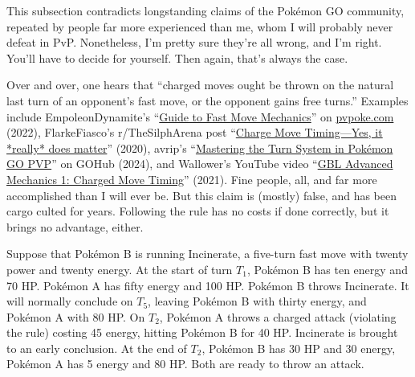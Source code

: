 \begin{tipbox}[title=Warning! Achtung! \begin{chinese}危险！\end{chinese} ¡Peligro! \begin{japanese}危険!\end{japanese} \textit{Tulaga faigata!}]
This subsection contradicts longstanding claims of the Pokémon GO community, repeated by
  people far more experienced than me, whom I will probably never defeat in PvP.
Nonetheless, I'm pretty sure they're all wrong, and I'm right.
You'll have to decide for yourself.
Then again, that's always the case.
\end{tipbox}
\noindent{}Over and over, one hears that ``charged moves ought be thrown on the natural last turn of an
 opponent's fast move, or the opponent gains free turns.''
Examples include EmpoleonDynamite's ``\href{https://pvpoke.com/articles/strategy/guide-to-fast-move-registration/}{Guide to Fast Move Mechanics}''
 on \href{https://pvpoke.com}{pvpoke.com} (2022), FlarkeFiasco's r/TheSilphArena post ``\href{reddit.com/r/TheSilphArena/comments/fvu62a/charge\_move\_timing\_yes\_it\_really\_does\_matter/}{Charge Move Timing---Yes, it *really* does matter}'' (2020),
 avrip's ``\href{https://pokemongohub.net/post/pvp/mastering-the-turn-system-in-pokemon-go-pvp/}{Mastering the Turn System in Pokémon GO PVP}'' on GOHub (2024),
 and Wallower's YouTube video ``\href{https://www.youtube.com/watch?v=pAtCo8xg700}{GBL Advanced Mechanics 1: Charged Move Timing}'' (2021).
Fine people, all, and far more accomplished than I will ever be.
But this claim is (mostly) false, and has been cargo culted for years.
Following the rule has no costs if done correctly, but it brings no advantage, either.

Suppose that Pokémon B is running Incinerate, a five-turn fast move with twenty power and twenty energy.
At the start of turn $T_1$, Pokémon B has ten energy and 70 HP\@.
Pokémon A has fifty energy and 100 HP\@.
Pokémon B throws Incinerate.
It will normally conclude on $T_5$, leaving Pokémon B with thirty energy, and Pokémon A with 80 HP\@.
On $T_2$, Pokémon A throws a charged attack (violating the rule) costing 45 energy, hitting Pokémon B for 40 HP\@.
Incinerate is brought to an early conclusion.
At the end of $T_2$, Pokémon B has 30 HP and 30 energy, Pokémon A has 5 energy and 80 HP.
Both are ready to throw an attack.

